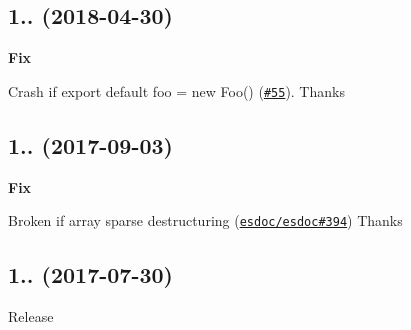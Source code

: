 \subsection*{1.. (2018-\/04-\/30)}


\begin{DoxyItemize}
\item {\bfseries Fix}
\begin{DoxyItemize}
\item Crash if {\ttfamily export default foo = new Foo()} (\href{https://github.com/esdoc/esdoc-plugins/pull/55}{\tt \#55}). Thanks \href{https://github.com/ushu}{\tt }
\end{DoxyItemize}
\end{DoxyItemize}

\subsection*{1.. (2017-\/09-\/03)}


\begin{DoxyItemize}
\item {\bfseries Fix}
\begin{DoxyItemize}
\item Broken if array sparse destructuring (\href{https://github.com/esdoc/esdoc/pull/394}{\tt esdoc/esdoc\#394}) Thanks \href{https://github.com/technicallyfeasible}{\tt }
\end{DoxyItemize}
\end{DoxyItemize}

\subsection*{1.. (2017-\/07-\/30)}


\begin{DoxyItemize}
\item Release 
\end{DoxyItemize}